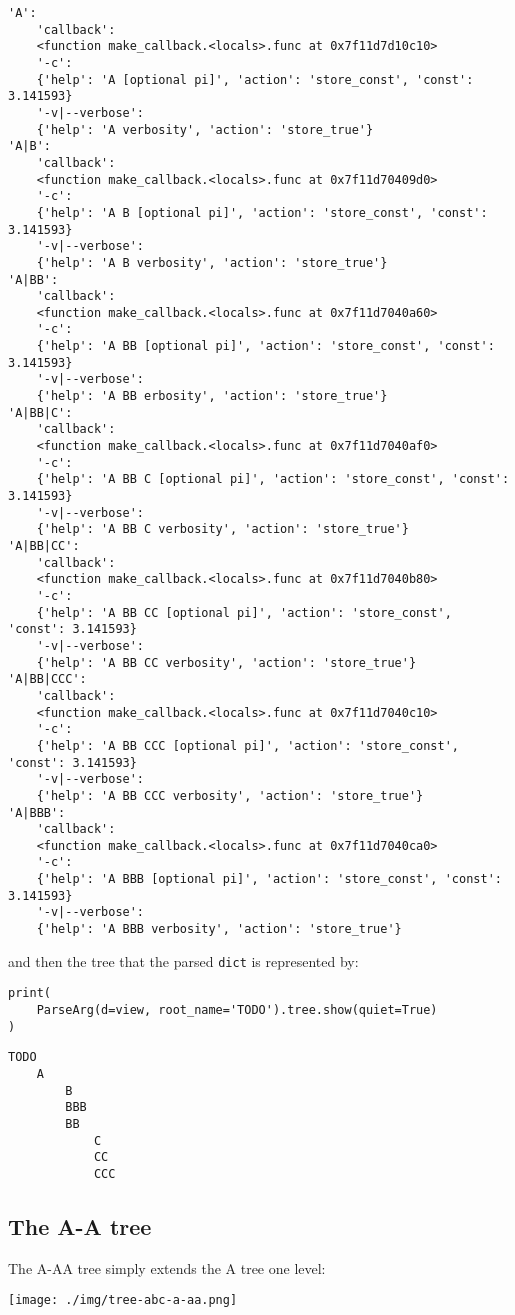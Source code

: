 \documentclass[10pt]{amsart}
\numberwithin{equation}{section}
\begin{document}
\begin{verbatim}
'A':
    'callback':
    <function make_callback.<locals>.func at 0x7f11d7d10c10>
    '-c':
    {'help': 'A [optional pi]', 'action': 'store_const', 'const': 3.141593}
    '-v|--verbose':
    {'help': 'A verbosity', 'action': 'store_true'}
'A|B':
    'callback':
    <function make_callback.<locals>.func at 0x7f11d70409d0>
    '-c':
    {'help': 'A B [optional pi]', 'action': 'store_const', 'const': 3.141593}
    '-v|--verbose':
    {'help': 'A B verbosity', 'action': 'store_true'}
'A|BB':
    'callback':
    <function make_callback.<locals>.func at 0x7f11d7040a60>
    '-c':
    {'help': 'A BB [optional pi]', 'action': 'store_const', 'const': 3.141593}
    '-v|--verbose':
    {'help': 'A BB erbosity', 'action': 'store_true'}
'A|BB|C':
    'callback':
    <function make_callback.<locals>.func at 0x7f11d7040af0>
    '-c':
    {'help': 'A BB C [optional pi]', 'action': 'store_const', 'const': 3.141593}
    '-v|--verbose':
    {'help': 'A BB C verbosity', 'action': 'store_true'}
'A|BB|CC':
    'callback':
    <function make_callback.<locals>.func at 0x7f11d7040b80>
    '-c':
    {'help': 'A BB CC [optional pi]', 'action': 'store_const', 'const': 3.141593}
    '-v|--verbose':
    {'help': 'A BB CC verbosity', 'action': 'store_true'}
'A|BB|CCC':
    'callback':
    <function make_callback.<locals>.func at 0x7f11d7040c10>
    '-c':
    {'help': 'A BB CCC [optional pi]', 'action': 'store_const', 'const': 3.141593}
    '-v|--verbose':
    {'help': 'A BB CCC verbosity', 'action': 'store_true'}
'A|BBB':
    'callback':
    <function make_callback.<locals>.func at 0x7f11d7040ca0>
    '-c':
    {'help': 'A BBB [optional pi]', 'action': 'store_const', 'const': 3.141593}
    '-v|--verbose':
    {'help': 'A BBB verbosity', 'action': 'store_true'}
\end{verbatim}
and then the tree that the parsed \texttt{dict} is represented by:
\begin{verbatim}
print(
    ParseArg(d=view, root_name='TODO').tree.show(quiet=True)
)
\end{verbatim}

\begin{verbatim}
TODO
    A
        B
        BBB
        BB
            C
            CC
            CCC
\end{verbatim}

\subsection{The A-A tree}
\label{sec:org848a47b}
The A-AA tree simply extends the A tree one level:
\begin{center}
\texttt{[image: ./img/tree-abc-a-aa.png]}
\end{center}
\end{document}
